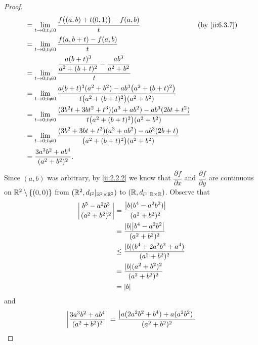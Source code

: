 \begin{proof}
\begin{align*}
     & = \lim_{t \to 0 ; t \neq 0} \dfrac{f\big((a, b) + t(0, 1)\big) - f(a, b)}{t}                                                             &  & \by{ii:6.3.7} \\
     & = \lim_{t \to 0 ; t \neq 0} \dfrac{f(a, b + t) - f(a, b)}{t}                                                                                                \\
     & = \lim_{t \to 0 ; t \neq 0} \dfrac{\dfrac{a (b + t)^3}{a^2 + (b + t)^2} - \dfrac{ab^3}{a^2 + b^2}}{t}                                                       \\
     & = \lim_{t \to 0 ; t \neq 0} \dfrac{a (b + t)^3 (a^2 + b^2) - a b^3 \big(a^2 + (b + t)^2\big)}{t \big(a^2 + (b + t)^2\big) (a^2 + b^2)}                      \\
     & = \lim_{t \to 0 ; t \neq 0} \dfrac{(3 b^2 t + 3 b t^2 + t^3) (a^3 + a b^2) - a b^3 (2bt + t^2)}{t \big(a^2 + (b + t)^2\big) (a^2 + b^2)}                    \\
     & = \lim_{t \to 0 ; t \neq 0} \dfrac{(3 b^2 + 3 b t + t^2) (a^3 + a b^2) - a b^3 (2b + t)}{\big(a^2 + (b + t)^2\big) (a^2 + b^2)}                             \\
     & = \dfrac{3 a^3 b^2 + a b^4}{(a^2 + b^2)^2}.
  \end{align*}
  Since \((a, b)\) was arbitrary, by \cref{ii:2.2.2} we know that \(\dfrac{\partial f}{\partial x}\) and \(\dfrac{\partial f}{\partial y}\) are continuous on \(\mathbb{R}^2 \setminus \left\lbrace(0, 0)\right\rbrace\) from \((\mathbb{R}^2, d_{l^2}|_{\mathbb{R}^2 \times \mathbb{R}^2})\) to \((\mathbb{R}, d_{l^1}|_{\mathbb{R} \times \mathbb{R}})\).
  Observe that
  \begin{align*}
    \abs{\dfrac{b^5 - a^2 b^3}{(a^2 + b^2)^2}} & = \dfrac{\abs{b (b^4 - a^2 b^2)}}{(a^2 + b^2)^2}            \\
                                               & = \dfrac{\abs{b} \abs{b^4 - a^2 b^2}}{(a^2 + b^2)^2}        \\
                                               & \leq \dfrac{\abs{b} (b^4 + 2 a^2 b^2 + a^4)}{(a^2 + b^2)^2} \\
                                               & = \dfrac{\abs{b} (a^2 + b^2)^2}{(a^2 + b^2)^2}              \\
                                               & = \abs{b}
  \end{align*}
  and
  \begin{align*}
    \abs{\dfrac{3 a^3 b^2 + a b^4}{(a^2 + b^2)^2}} & = \dfrac{\abs{a (2 a^2 b^2 + b^4) + a (a^2 b^2)}}{(a^2 + b^2)^2}                              \\

\end{align*}
\end{proof}
